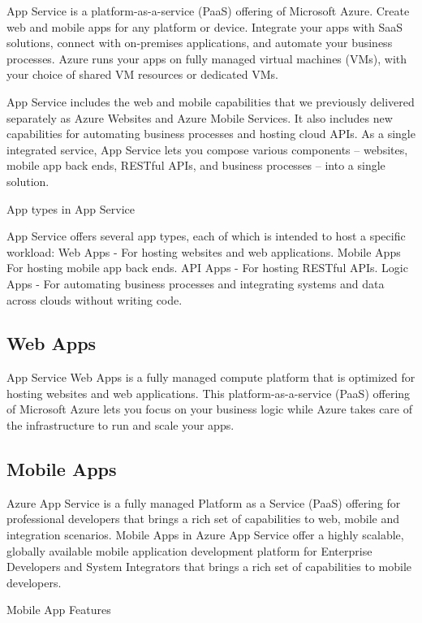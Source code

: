 App Service is a platform-as-a-service (PaaS) offering of Microsoft Azure. Create web and mobile apps for any platform or device. Integrate your apps with SaaS solutions, connect with on-premises applications, and automate your business processes. Azure runs your apps on fully managed virtual machines (VMs), with your choice of shared VM resources or dedicated VMs.

App Service includes the web and mobile capabilities that we previously delivered separately as Azure Websites and Azure Mobile Services. It also includes new capabilities for automating business processes and hosting cloud APIs. As a single integrated service, App Service lets you compose various components -- websites, mobile app back ends, RESTful APIs, and business processes -- into a single solution.


App types in App Service

App Service offers several app types, each of which is intended to host a specific workload:
Web Apps - For hosting websites and web applications.
Mobile Apps For hosting mobile app back ends.
API Apps - For hosting RESTful APIs.
Logic Apps - For automating business processes and integrating systems and data across clouds without writing code.



\subsection{Web Apps}

App Service Web Apps is a fully managed compute platform that is optimized for hosting websites and web applications. This platform-as-a-service (PaaS) offering of Microsoft Azure lets you focus on your business logic while Azure takes care of the infrastructure to run and scale your apps.


\subsection{Mobile Apps}

Azure App Service is a fully managed Platform as a Service (PaaS) offering for professional developers that brings a rich set of capabilities to web, mobile and integration scenarios. Mobile Apps in Azure App Service offer a highly scalable, globally available mobile application development platform for Enterprise Developers and System Integrators that brings a rich set of capabilities to mobile developers.


Mobile App Features

